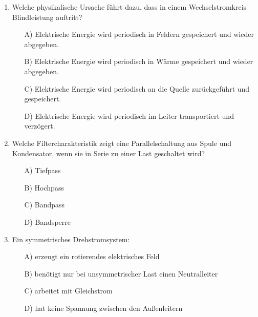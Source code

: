 \documentclass[a4paper,12pt]{article}
\newif\ifshowsolutions
\begin{document}
\begin{enumerate}[label=\textbf{\arabic*.}, leftmargin=*, itemsep=8pt]
  \item Welche physikalische Ursache führt dazu, dass in einem Wechselstromkreis Blindleistung auftritt?
    \begin{itemize}[label=$\square$]
      \item[A)] Elektrische Energie wird periodisch in Feldern gespeichert und wieder abgegeben.
      \item[B)] Elektrische Energie wird periodisch in Wärme gespeichert und wieder abgegeben.
      \item[C)] Elektrische Energie wird periodisch an die Quelle zurückgeführt und gespeichert.
      \item[D)] Elektrische Energie wird periodisch im Leiter transportiert und verzögert.
    \end{itemize}

\ifshowsolutions
Lösung: A
\fi

  \item Welche Filtercharakteristik zeigt eine Parallelschaltung aus Spule und Kondensator, wenn sie in Serie zu einer Last geschaltet wird?
    \begin{itemize}[label=$\square$]
      \item[A)] Tiefpass
      \item[B)] Hochpass
      \item[C)] Bandpass
      \item[D)] Bandsperre
    \end{itemize}

\ifshowsolutions
Lösung: D
\fi

  \item Ein symmetrisches Drehstromsystem:
    \begin{itemize}[label=$\square$]
      \item[A)] erzeugt ein rotierendes elektrisches Feld
      \item[B)] benötigt nur bei unsymmetrischer Last einen Neutralleiter
      \item[C)] arbeitet mit Gleichstrom
      \item[D)] hat keine Spannung zwischen den Außenleitern
    \end{itemize}

\ifshowsolutions
Lösung: B
\fi

\end{enumerate}
\end{document}
